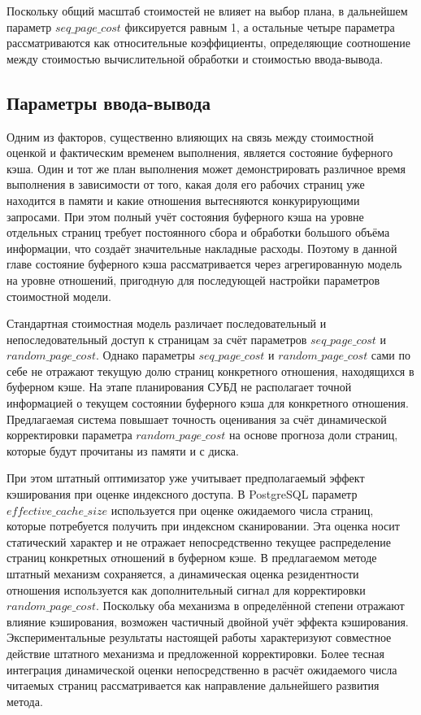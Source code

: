 Поскольку общий масштаб стоимостей не влияет на выбор плана, в дальнейшем
параметр \(seq\_page\_cost\) фиксируется равным 1, а остальные четыре
параметра рассматриваются как относительные коэффициенты, определяющие
соотношение между стоимостью вычислительной обработки и стоимостью
ввода-вывода.



\subsection{Параметры ввода-вывода}

Одним из факторов, существенно влияющих на связь между стоимостной оценкой и фактическим временем выполнения, является состояние буферного кэша. Один и тот же план выполнения может демонстрировать различное время выполнения в зависимости от того, какая доля его рабочих страниц уже находится в памяти и какие отношения вытесняются конкурирующими запросами. При этом полный учёт состояния буферного кэша на уровне отдельных страниц требует постоянного сбора и обработки большого объёма информации, что создаёт значительные накладные расходы. Поэтому в данной главе состояние буферного кэша рассматривается через агрегированную модель на уровне отношений, пригодную для последующей настройки параметров стоимостной модели.

Стандартная стоимостная модель различает последовательный и непоследовательный доступ к страницам за счёт параметров \(seq\_page\_cost\) и \(random\_page\_cost\). Однако параметры \(seq\_page\_cost\) и \(random\_page\_cost\) сами по себе не отражают текущую долю страниц конкретного отношения, находящихся в буферном кэше. На этапе планирования СУБД не располагает точной информацией о текущем состоянии буферного кэша для конкретного отношения. Предлагаемая система повышает точность оценивания за счёт динамической корректировки параметра \(random\_page\_cost\) на основе прогноза доли страниц, которые будут прочитаны из памяти и с диска.

При этом штатный оптимизатор уже учитывает предполагаемый эффект кэширования при оценке индексного доступа. В PostgreSQL параметр \(effective\_cache\_size\) используется при оценке ожидаемого числа страниц, которые потребуется получить при индексном сканировании. Эта оценка носит статический характер и не отражает непосредственно текущее распределение страниц конкретных отношений в буферном кэше. В предлагаемом методе штатный механизм сохраняется, а динамическая оценка резидентности отношения используется как дополнительный сигнал для корректировки \(random\_page\_cost\). Поскольку оба механизма в определённой степени отражают влияние кэширования, возможен частичный двойной учёт эффекта кэширования. Экспериментальные результаты настоящей работы характеризуют совместное действие штатного механизма и предложенной корректировки. Более тесная интеграция динамической оценки непосредственно в расчёт ожидаемого числа читаемых страниц рассматривается как направление дальнейшего развития метода.

